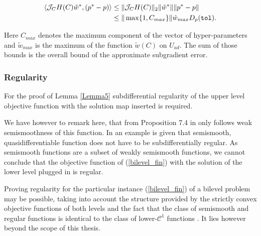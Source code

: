 \begin{align*}
	\left\langle \mathcal{J}_CH(C)\tilde{w}^*, (p^*-p) \right\rangle &\leq \Vert \mathcal{J}_CH(C) \Vert_2 \Vert\tilde{w}^* \Vert \Vert p^*-p \Vert \\
	& \leq \Vert \max\{1,C_{max}\} \Vert \tilde{w}_{max}  D_{p}(\mathtt{tol}).
\end{align*}

Here \(C_{max}\) denotes the maximum component of the vector of hyper-parameters and \(\tilde{w}_{max}\) is the maximum of the function \(\tilde{w}(C)\) on \(U_{ad}\).
The sum of those bounds is the overall bound of the approximate subgradient error.



\subsubsection{Regularity}

For the proof of Lemma \ref{Lemma5} subdifferential regularity of the upper level objective function with the solution map inserted is required.

We have however to remark here, that from Proposition 7.4 in \cite{Outrata1998} only follows weak semismoothness of this function.
In \cite[p. 82]{Spingarn1981} an example is given that semismooth, quasidifferentiable function does not have to be subdifferentially regular. As semismooth functions are a subset of weakly semismooth functions, we cannot conclude that the objective function of (\ref{bilevel_fin}) with the solution of the lower level plugged in is regular.

Proving regularity for the particular instance (\ref{bilevel_fin}) of a bilevel problem may be possible, taking into account the structure provided by the strictly convex objective functions of both levels and the fact that the class of semismooth and regular functions is identical to the class of lower-\(\mathcal{C}^1\) functions \cite[equation (3), p. 5]{Hare2016}. It lies however beyond the scope of this thesis.

